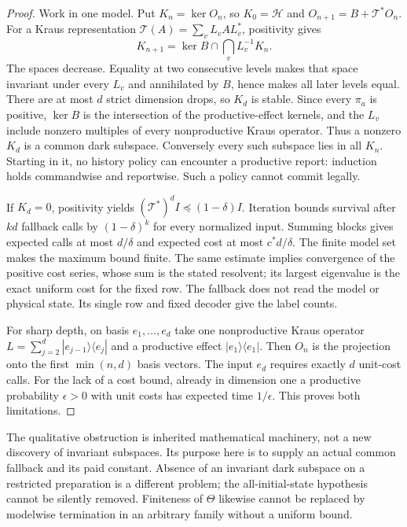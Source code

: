 \begin{proof}
Work in one model. Put $K_n=\ker O_n$, so $K_0=\mathcal H$ and
$O_{n+1}=B+\mathcal T^*O_n$. For a Kraus representation $\mathcal T(A)=\sum_vL_vAL_v^*$, positivity gives
\[
 K_{n+1}=\ker B\cap\bigcap_vL_v^{-1}K_n.
\]
The spaces decrease. Equality at two consecutive levels makes that space invariant under every $L_v$ and annihilated by $B$, hence makes all later levels equal. There are at most $d$ strict dimension drops, so $K_d$ is stable. Since every $\pi_a$ is positive, $\ker B$ is the intersection of the productive-effect kernels, and the $L_v$ include nonzero multiples of every nonproductive Kraus operator. Thus a nonzero $K_d$ is a common dark subspace. Conversely every such subspace lies in all $K_n$. Starting in it, no history policy can encounter a productive report: induction holds commandwise and reportwise. Such a policy cannot commit legally.

If $K_d=0$, positivity yields $(\mathcal T^*)^dI\preccurlyeq(1-\delta)I$. Iteration bounds survival after $kd$ fallback calls by $(1-\delta)^k$ for every normalized input. Summing blocks gives expected calls at most $d/\delta$ and expected cost at most $c^*d/\delta$. The finite model set makes the maximum bound finite. The same estimate implies convergence of the positive cost series, whose sum is the stated resolvent; its largest eigenvalue is the exact uniform cost for the fixed row. The fallback does not read the model or physical state. Its single row and fixed decoder give the label counts.

For sharp depth, on basis $e_1,\ldots,e_d$ take one nonproductive Kraus operator $L=\sum_{j=2}^d|e_{j-1}\rangle\langle e_j|$ and a productive effect $|e_1\rangle\langle e_1|$. Then $O_n$ is the projection onto the first $\min(n,d)$ basis vectors. The input $e_d$ requires exactly $d$ unit-cost calls. For the lack of a cost bound, already in dimension one a productive probability $\epsilon>0$ with unit costs has expected time $1/\epsilon$. This proves both limitations.
\end{proof}

The qualitative obstruction is inherited mathematical machinery, not a new discovery of invariant subspaces. Its purpose here is to supply an actual common fallback and its paid constant. Absence of an invariant dark subspace on a restricted preparation is a different problem; the all-initial-state hypothesis cannot be silently removed. Finiteness of $\Theta$ likewise cannot be replaced by modelwise termination in an arbitrary family without a uniform bound.

